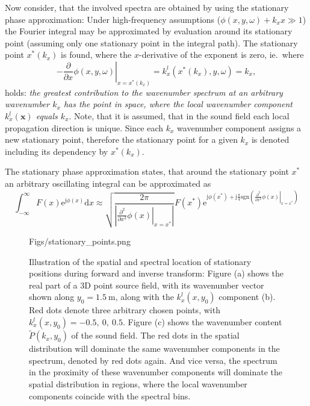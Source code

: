 \documentclass[12pt,a4paper]{article}
\newcommand{\td}{\mathrm{d}}
\newcommand{\te}{\mathrm{e}}
\newcommand{\ti}{\mathrm{j}}
\newcommand{\vx}{\mathbf{x}}
\begin{document}
Now consider, that the involved spectra are obtained by using the stationary phase approximation:
Under high-frequency assumptions ($\phi(x,y,\omega)+k_x x \gg 1$) the Fourier integral may be approximated by evaluation around its stationary point (assuming only one stationary point in the integral path).
The stationary point $x^*(k_x)$ is found, where the $x$-derivative of the exponent is zero, ie.\ where
\begin{equation}
- \left. \frac{\partial}{\partial x} \phi(x,y,\omega) \right|_{x = x^*(k_x)} = k_x^l(x^*(k_x),y,\omega) = k_x,
\end{equation}
holds: \emph{the greatest contribution to the wavenumber spectrum at an arbitrary wavenumber $k_x$ has the point in space, where the local wavenumber component $k_x^l(\vx)$ equals $k_x$}.
Note, that it is assumed, that in the sound field each local propagation direction is unique.
Since each $k_x$ wavenumber component assigns a new stationary point, therefore the stationary point for a given $k_x$ is denoted including its dependency by $x^*(k_x)$.

The stationary phase approximation states, that around the stationary point $x^*$ an arbitrary oscillating integral can be approximated as 
\begin{equation}
\int_{-\infty}^{\infty} F(x)\te^{\ti \phi(x)} \td x \approx \sqrt{\frac{2\pi}{| \left. \frac{\partial^2}{\partial x^2} \phi(x)\right|_{x = x^*}|  }}
F(x^*) \te^{\ti \phi(x^*) + 
\ti \frac{\pi}{4} \text{sgn}\left( \left. \frac{\partial^2}{\partial x^2} \phi(x)\right|_{x = x^*} \right)}
\end{equation}

\begin{figure}
	\centering
	\begin{overpic}[width = 1\columnwidth]{Figs/stationary_points.png}
	\scriptsize
	\end{overpic}
	\caption{Illustration of the spatial and spectral location of stationary positions during forward and inverse transform: Figure (a) shows the real part of a 3D point source field, with its wavenumber vector shown along $y_0 = 1.5~\mathrm{m}$, along with the $k^l_x(x,y_0)$ component (b).
Red dots denote three arbitrary chosen points, with $k^l_x(x,y_0) = -0.5,\ 0,\ 0.5$.
Figure (c) shows the wavenumber content $\tilde{P}(k_x,y_0)$ of the sound field.
The red dots in the spatial distribution will dominate the same wavenumber components in the spectrum, denoted by red dots again.
And vice versa, the spectrum in the proximity of these wavenumber components will dominate the spatial distribution in regions, where the local wavenumber components coincide with the spectral bins.}
	\label{fig:stationary_positions}
\end{figure}
\end{document}

